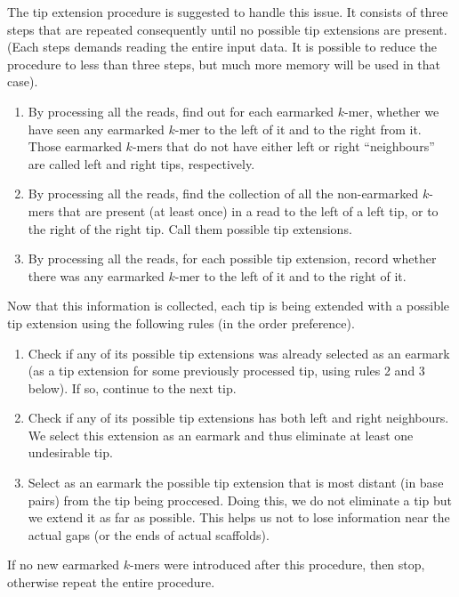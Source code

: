 \documentclass[12pt]{article}
\begin{document}
The tip extension procedure is suggested to handle this issue.
It consists of three steps that are repeated consequently until 
no possible tip extensions are present.
(Each steps demands reading the entire input data. It is possible to reduce the procedure to less than three
steps, but much more memory will be used in that case).


\begin{enumerate}
\item By processing all the reads, find out for each earmarked $k$-mer, whether we have seen any
earmarked $k$-mer to the left of it and to the right from it.
Those earmarked $k$-mers that do not have either left or right ``neighbours'' are called left and right tips,
respectively.
\item By processing all the reads, find the collection of all the non-earmarked $k$-mers that
are present (at least once) in a read to the left of a left tip, or to the right of the right tip.
Call them possible tip extensions.
\item By processing all the reads, for each possible tip extension, record whether there was
any earmarked $k$-mer to the left of it and to the right of it.
\end{enumerate}

Now that this information is collected, each tip is being extended with
a possible tip extension using the following rules (in the order preference).

\begin{enumerate}
\item Check if any of its possible tip extensions was already selected as an earmark
(as a tip extension for some previously processed tip, using rules 2 and 3 below).
If so, continue to the next tip.
\item Check if any of its possible tip extensions has both left and right neighbours.
We select this extension as an earmark and thus eliminate at least one undesirable tip.
\item Select as an earmark the possible tip extension that is most distant (in base pairs)
from the tip being proccesed. Doing this, we do not eliminate a tip but we extend it as far
as possible. This helps us not to lose information near the actual gaps (or the ends of actual scaffolds).
\end{enumerate}

If no new earmarked $k$-mers were introduced after this procedure, then stop, otherwise repeat the entire procedure.
\end{document}

